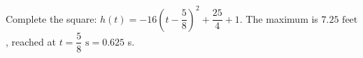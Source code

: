 Complete the square: $h(t)=-16\left(t-\dfrac{5}{8}\right)^2+\dfrac{25}{4}+1$. The maximum is $\boxed{7.25\text{ feet}}$, reached at $t=\boxed{\dfrac{5}{8}\text{ s}}=0.625$ s.

